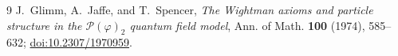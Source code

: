 \documentclass[11pt,a4paper]{article}
\theoremstyle{remark}
\begin{document}
\enlargethispage{2\baselineskip}
\begin{thebibliography}{9}
J.~Glimm, A.~Jaffe, and T.~Spencer,
\emph{The Wightman axioms and particle structure in the $\mathscr P(\varphi)_2$ quantum field
model}, Ann. of Math. \textbf{100} (1974), 585--632;
\href{https://doi.org/10.2307/1970959}{doi:10.2307/1970959}.
\end{thebibliography}
\end{document}
